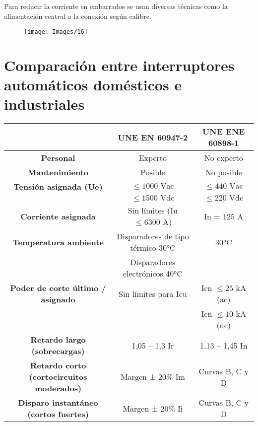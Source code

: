 Para reducir la corriente en embarrados se usan diversas técnicas como la alimentación central o la conexión según calibre.
\begin{figure}[H]
	\centering
	\texttt{[image: Images/16]}
	\label{fig:16}
\end{figure}
\section{Comparación entre interruptores automáticos domésticos e industriales}
\begin{table}[H]
	\centering
	\begin{tabular}{|c|c|c|}
		\cline{2-3}
		\multicolumn{1}{c|}{}                           & \textbf{UNE EN 60947-2}              & \textbf{UNE ENE 60898-1} \\ \hline
		\textbf{Personal}                               & Experto                              & No experto               \\ \hline
		\textbf{Mantenimiento}                          & Posible                              & No posible               \\ \hline
		\textbf{Tensión asignada (Ue)}                  & $\leq 1000 \text{ Vac}$              & $\leq 440 \text{ Vac}$   \\ \cline{2-3} 
		& $\leq 1500 \text{ Vdc}$              & $\leq 220 \text{ Vdc}$   \\ \hline
		\textbf{Corriente asignada}                     & Sin límites (Iu $\leq 6300$ A)       & In = 125 A               \\ \hline
		\textbf{Temperatura ambiente}                   & Disparadores de tipo térmico 30°C    & 30°C                     \\ \cline{2-3} 
		& Disparadores electrónicos 40°C       &                          \\ \hline
		\textbf{Poder de corte último / asignado}       & Sin límites para Icu                 & Icn $\leq 25$ kA (ac)    \\ \cline{3-3} 
		&                                      & Icn $\leq 10$ kA (dc)    \\ \hline
		\textbf{Retardo largo (sobrecargas)}            & 1,05 – 1,3 Ir                        & 1,13 – 1,45 In           \\ \hline
		\textbf{Retardo corto (cortocircuitos moderados)}& Margen ± 20\% Im                     & Curvas B, C y D          \\ \hline
		\textbf{Disparo instantáneo (cortos fuertes)}   & Margen ± 20\% Ii                     & Curvas B, C y D          \\ \hline
	\end{tabular}
\end{table}

